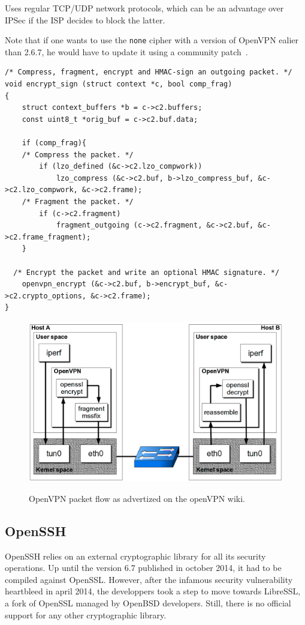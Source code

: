 Uses regular TCP/UDP network protocols, which can be an advantage over IPSec if the ISP decides to block the latter.

Note that if one wants to use the \texttt{none} cipher with a version of OpenVPN ealier than 2.6.7, he would have to update it using a community patch~\cite{openvpn-patch-none}.


\lstset{language=c}
\begin{lstlisting}[caption=openvpn compress then encrypt -- sample from \texttt{forward.c}, label=list:openvpn-workflow]
/* Compress, fragment, encrypt and HMAC-sign an outgoing packet. */
void encrypt_sign (struct context *c, bool comp_frag)
{
	struct context_buffers *b = c->c2.buffers;
	const uint8_t *orig_buf = c->c2.buf.data;

	if (comp_frag){
	/* Compress the packet. */
		if (lzo_defined (&c->c2.lzo_compwork))
			lzo_compress (&c->c2.buf, b->lzo_compress_buf, &c->c2.lzo_compwork, &c->c2.frame);
	/* Fragment the packet. */
		if (c->c2.fragment)
			fragment_outgoing (c->c2.fragment, &c->c2.buf, &c->c2.frame_fragment);
	}

  /* Encrypt the packet and write an optional HMAC signature. */
	openvpn_encrypt (&c->c2.buf, b->encrypt_buf, &c->c2.crypto_options, &c->c2.frame);
}
\end{lstlisting}

\begin{figure}[ht]
\includegraphics[width=\textwidth]{OpenVPN-packetflow}
\caption{OpenVPN packet flow as advertized on the openVPN wiki.}{}
\label{fig:openvpn-packet-flow}
\end{figure}


\subsection{OpenSSH}
OpenSSH relies on an external cryptographic library for all its security operations.
Up until the version 6.7 published in october 2014, it had to be compiled against OpenSSL.
However, after the infamous security vulnerability heartbleed in april 2014, the developpers took a step to move towards LibreSSL, a fork of OpenSSL managed by OpenBSD  developers.
Still, there is no official support for any other cryptographic library.

